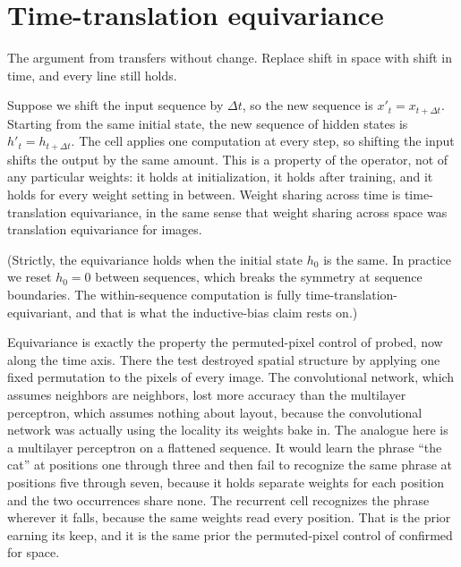 
\section{Time-translation equivariance}\label{sec:time-equivariance}

The argument from  transfers without change. Replace shift in
space with shift in time, and every line still holds.

Suppose we shift the input sequence by $\Delta t$, so the new sequence is
$x'_t = x_{t + \Delta t}$. Starting from the same initial state, the new
sequence of hidden states is $h'_t = h_{t + \Delta t}$. The cell applies one
computation at every step, so shifting the input shifts the output by the
same amount. This is a property of the operator, not of any particular
weights: it holds at initialization, it holds after training, and it holds
for every weight setting in between. Weight sharing across time is
time-translation equivariance, in the same sense that weight sharing across
space was translation equivariance for images.

(Strictly, the equivariance holds when the initial state $h_0$ is the same.
In practice we reset $h_0 = 0$ between sequences, which breaks the symmetry
at sequence boundaries. The within-sequence computation is fully
time-translation-equivariant, and that is what the inductive-bias claim
rests on.)

Equivariance is exactly the property the permuted-pixel control of
 probed, now along the time axis. There the test
destroyed spatial structure by applying one fixed permutation to the pixels
of every image. The convolutional network, which assumes neighbors are
neighbors, lost more accuracy than the multilayer perceptron, which assumes
nothing about layout, because the convolutional network was actually using
the locality its weights bake in. The analogue here is a multilayer
perceptron on a flattened sequence. It would learn the phrase ``the cat'' at
positions one through three and then fail to recognize the same phrase at
positions five through seven, because it holds separate weights for each
position and the two occurrences share none. The recurrent cell recognizes
the phrase wherever it falls, because the same weights read every position.
That is the prior earning its keep, and it is the same prior the
permuted-pixel control of  confirmed for space.

